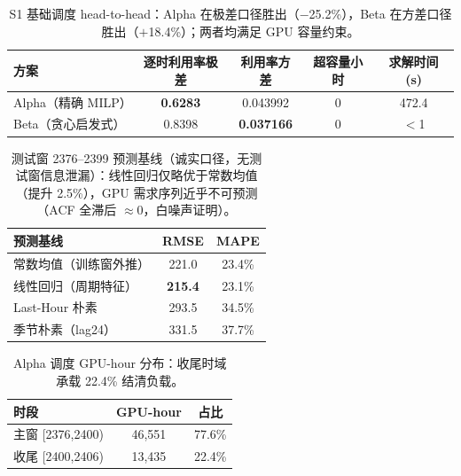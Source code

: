 
\begin{table}[h]
\centering
\footnotesize
\begin{tabular}{lcccc}
\toprule
方案 & 逐时利用率极差 & 利用率方差 & 超容量小时 & 求解时间 (s) \\
\midrule
Alpha（精确 MILP） & \textbf{0.6283} & 0.043992 & 0 & 472.4 \\
Beta（贪心启发式） & 0.8398 & \textbf{0.037166} & 0 & $<$1 \\
\bottomrule
\end{tabular}
\caption{S1 基础调度 head-to-head：Alpha 在极差口径胜出（$-$25.2\%），Beta 在方差口径胜出（$+$18.4\%）；两者均满足 GPU 容量约束。}
\label{tab:s1-head2head}
\end{table}

\begin{table}[h]
\centering
\footnotesize
\begin{tabular}{lcc}
\toprule
预测基线 & RMSE & MAPE \\
\midrule
常数均值（训练窗外推） & 221.0 & 23.4\% \\
线性回归（周期特征） & \textbf{215.4} & 23.1\% \\
Last-Hour 朴素 & 293.5 & 34.5\% \\
季节朴素（lag24） & 331.5 & 37.7\% \\
\bottomrule
\end{tabular}
\caption{测试窗 2376--2399 预测基线（诚实口径，无测试窗信息泄漏）：线性回归仅略优于常数均值（提升 2.5\%），GPU 需求序列近乎不可预测（ACF 全滞后 $\approx$0，白噪声证明）。}
\label{tab:s1-forecast}
\end{table}

\begin{table}[h]
\centering
\footnotesize
\begin{tabular}{lcc}
\toprule
时段 & GPU-hour & 占比 \\
\midrule
主窗 [2376,2400) & 46,551 & 77.6\% \\
收尾 [2400,2406) & 13,435 & 22.4\% \\
\bottomrule
\end{tabular}
\caption{Alpha 调度 GPU-hour 分布：收尾时域承载 22.4\% 结清负载。}
\label{tab:s1-tail}
\end{table}
